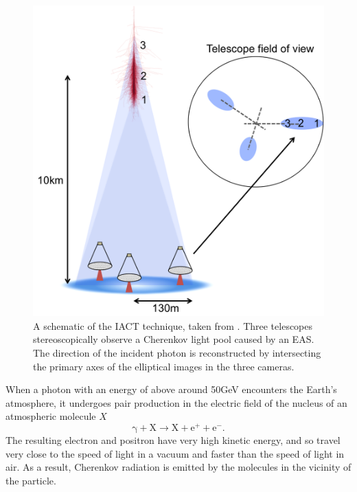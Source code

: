 \begin{figure}[ht] 
        \centering \includegraphics[width=0.7\columnwidth]{figures/schematic.png}

        \caption{
                \label{fig:schem} %
                A schematic of the IACT technique, taken from \cite{jamieiact}. Three telescopes stereoscopically observe a
                Cherenkov light pool caused by an EAS. The direction of the incident photon is reconstructed by intersecting the primary axes of 				 the elliptical images in the three cameras.
        }
\end{figure}
When a photon with an energy of above around 50GeV encounters the Earth's atmosphere, it undergoes pair production in the electric field of the nucleus of an atmospheric molecule $X$
\begin{equation}
\mathrm{\gamma}+\mathrm{X} \rightarrow \mathrm{X}+\mathrm{e^+}+ \mathrm{e^-}.
\end{equation}
The resulting electron and positron have very high kinetic energy, and so travel very close to the speed of light in a vacuum and faster than the speed of light in air. As a result, Cherenkov radiation is emitted by the molecules in the vicinity of the particle.
